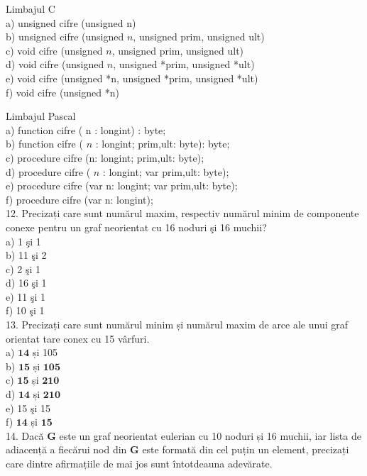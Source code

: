 Limbajul C\\
a) unsigned cifre (unsigned n)\\
b) unsigned cifre (unsigned $n$, unsigned prim, unsigned ult)\\
c) void cifre (unsigned $n$, unsigned prim, unsigned ult)\\
d) void cifre (unsigned $n$, unsigned *prim, unsigned *ult)\\
e) void cifre (unsigned *n, unsigned *prim, unsigned *ult)\\
f) void cifre (unsigned *n)

Limbajul Pascal\\
a) function cifre ( n : longint) : byte;\\
b) function cifre ( $n$ : longint; prim,ult: byte): byte;\\
c) procedure cifre (n: longint; prim,ult: byte);\\
d) procedure cifre ( $n$ : longint; var prim,ult: byte);\\
e) procedure cifre (var n: longint; var prim,ult: byte);\\
f) procedure cifre (var n: longint);\\
12. Precizați care sunt numărul maxim, respectiv numărul minim de componente conexe pentru un graf neorientat cu 16 noduri şi 16 muchii?\\
a) 1 şi 1\\
b) 11 şi 2\\
c) 2 şi 1\\
d) 16 şi 1\\
e) 11 şi 1\\
f) 10 şi 1\\
13. Precizați care sunt numărul minim și numărul maxim de arce ale unui graf orientat tare conex cu 15 vârfuri.\\
a) $\mathbf{1 4}$ și 105\\
b) $\mathbf{1 5}$ și $\mathbf{1 0 5}$\\
c) $\mathbf{1 5}$ și $\mathbf{2 1 0}$\\
d) $\mathbf{1 4}$ și $\mathbf{2 1 0}$\\
e) 15 şi 15\\
f) $\mathbf{1 4}$ și $\mathbf{1 5}$\\
14. Dacă $\mathbf{G}$ este un graf neorientat eulerian cu 10 noduri și 16 muchii, iar lista de adiacență a fiecărui nod din $\mathbf{G}$ este formată din cel puțin un element, precizați care dintre afirmațiile de mai jos sunt întotdeauna adevărate.

